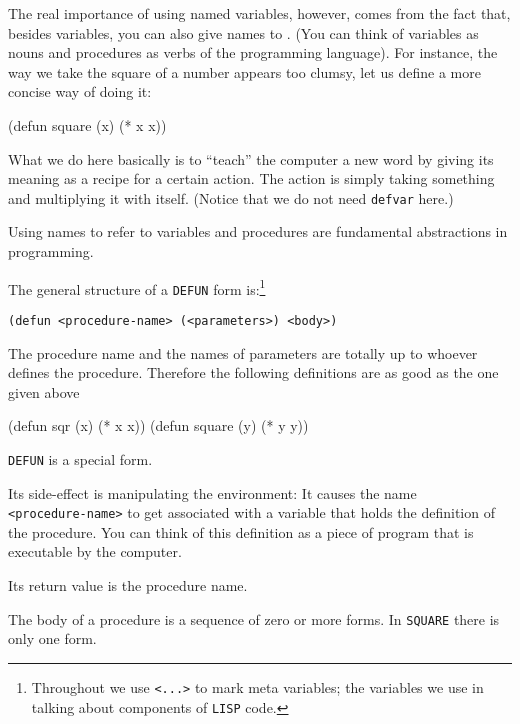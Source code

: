 \documentclass[a4paper,11pt]{article}
\begin{document}
\begin{uenum}
The real importance of using named variables, however, comes from the fact that, besides variables, you can also give names to . (You can think of variables as nouns and procedures as verbs of the programming language). For instance, the way we take the square of a number appears too clumsy, let us define a more concise way of doing it: 

\begin{lispcode}
(defun square (x) (* x x))
\end{lispcode}

What we do here basically is to ``teach'' the computer a new word by giving its meaning as a recipe for a certain action. The action is simply taking something and multiplying it with itself. (Notice that we do not need \Verb+defvar+ here.) 

Using names to refer to variables and procedures are fundamental abstractions in programming.

\begin{uenumi}

\item The general structure of a \Verb+DEFUN+ form is:\footnote{Throughout we use \Verb+<...>+ to mark meta variables; the variables we use in talking about components of \Verb+LISP+ code.}

\Verb+(defun <procedure-name> (<parameters>) <body>)+

\item The procedure name and the names of parameters are totally up to whoever defines the procedure. Therefore the following definitions are as good as the one given above

\begin{lispcode}
(defun sqr (x) (* x x))
(defun square (y) (* y y))
\end{lispcode}

\item \Verb+DEFUN+ is a special form. 
\begin{uenumi}
\item Its side-effect is manipulating the environment: It causes the name \\ \Verb+<procedure-name>+ to get associated with a variable that holds the definition of the procedure. You can think of this definition as a piece of program that is executable by the computer.
\item Its return value is the procedure name.
\end{uenumi}

\item The body of a procedure is a sequence of zero or more forms. In \Verb+SQUARE+ there is only one form.


\end{uenumi}
\end{uenum}
\end{document}
